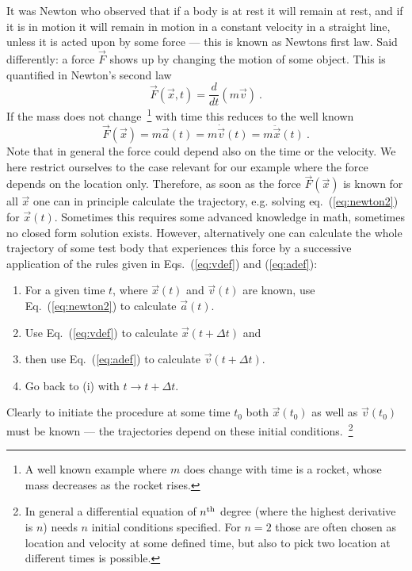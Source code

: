 \documentclass[12pt]{iopart}
\begin{document}
It was Newton who observed that if a body is at rest it will remain at rest, and if it is in motion it will remain in motion in a 
constant velocity in a straight line, unless it is acted upon by some force --- this is known as Newtons first law. 
Said differently: a force $\vec F$ shows up by changing the motion of some object. This is quantified in Newton's second law
\begin{equation}
\vec F(\vec x, t) = \frac{d}{dt}(m \vec v) \ .
\end{equation} 
If the mass does not change~\footnote{A well known example where $m$ does change with time is a 
rocket, whose mass decreases as the rocket rises.} with time this reduces to the well known
\begin{equation}
\vec F(\vec x) = m \vec a(t) = m\dot{\vec v}(t) = m\ddot{\vec{x}}(t) \ . \label{eq:newton2}
\end{equation} 
Note that in general the force could depend also on the time or the velocity. We here restrict ourselves to the
case relevant for our example where the force depends on the location only. 
Therefore, 
as soon as the force $\vec F(\vec x)$ is known for all $\vec x$ one can in principle calculate the trajectory, e.g. solving eq.~(\ref{eq:newton2})
for $\vec x(t)$.
Sometimes this requires some advanced knowledge in math, sometimes no closed form solution exists. However, alternatively 
one can calculate the whole trajectory
of some test body that experiences this force by a successive application of the rules 
given in Eqs.~(\ref{eq:vdef}) and (\ref{eq:adef}):
\begin{enumerate}
\item For a given time $t$, where $\vec x(t)$ and $\vec v(t)$ are known, use Eq.~(\ref{eq:newton2}) to calculate $\vec a(t)$.
\item Use Eq.~(\ref{eq:vdef}) to calculate $\vec x(t+\Delta t)$ and
\item then use Eq.~(\ref{eq:adef}) to calculate $\vec v(t+\Delta t)$.
\item Go back to (i) with $t\to t+\Delta t$.
\end{enumerate}
Clearly to initiate the procedure at some time $t_0$ both $\vec x(t_0)$ as well as $\vec v(t_0)$ must be known --- the 
trajectories depend on these initial conditions.~\footnote{In general a differential equation of $n^{\rm th}$ degree (where
the highest derivative is $n$) needs $n$ initial conditions specified. For $n=2$ those are often chosen as location and velocity
at some defined time, but also to pick two location at different times is possible. }
\end{document}
